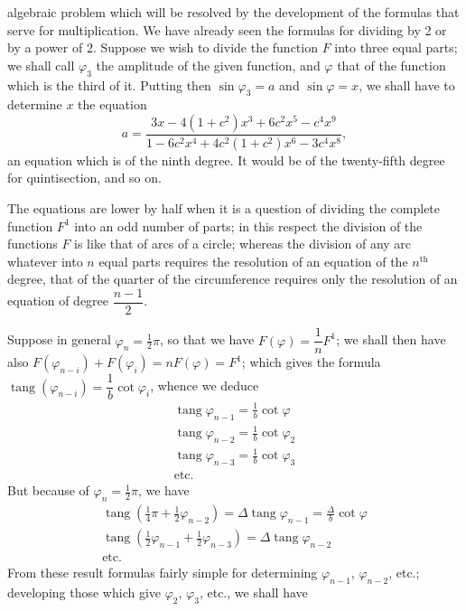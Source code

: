 \documentclass{article}
\begin{document}
algebraic problem which will be resolved by the development of the formulas that serve for multiplication. We have already seen the formulas for dividing by 2 or by a power of 2. Suppose we wish to divide the function $F$ into three equal parts; we shall call $\varphi_{3}$ the amplitude of the given function, and $\varphi$ that of the function which is the third of it. Putting then $\sin\varphi_{3}=a$ and $\sin\varphi=x$, we shall have to determine $x$ the equation
\[ a=\frac{3x-4(1+c^{2})x^{3}+6c^{2}x^{5}-c^{4}x^{9}}{1-6c^{2}x^{4}+4c^{2}(1+c^{2})x^{6}-3c^{4}x^{8}}, \]
an equation which is of the ninth degree. It would be of the twenty-fifth degree for quintisection, and so on.

The equations are lower by half when it is a question of dividing the complete function $F^{1}$ into an odd number of parts; in this respect the division of the functions $F$ is like that of arcs of a circle; whereas the division of any arc whatever into $n$ equal parts requires the resolution of an equation of the $n^{\text{th}}$ degree, that of the quarter of the circumference requires only the resolution of an equation of degree $\dfrac{n-1}{2}$.

Suppose in general $\varphi_{n}=\frac{1}{2}\pi$, so that we have $F(\varphi)=\dfrac{1}{n}F^{1}$; we shall then have also $F(\varphi_{n-i})+F(\varphi_{i})=nF(\varphi)=F^{1}$; which gives the formula $\operatorname{tang}(\varphi_{n-i})=\dfrac{1}{b}\cot\varphi_{i}$, whence we deduce
\[ \begin{gathered} \operatorname{tang}\varphi_{n-1}=\frac{1}{b}\cot\varphi \\ \operatorname{tang}\varphi_{n-2}=\frac{1}{b}\cot\varphi_{2} \\ \operatorname{tang}\varphi_{n-3}=\frac{1}{b}\cot\varphi_{3} \\ \text{etc.} \end{gathered} \]
But because of $\varphi_{n}=\frac{1}{2}\pi$, we have
\[ \begin{gathered} \operatorname{tang}(\tfrac{1}{4}\pi+\tfrac{1}{2}\varphi_{n-2})=\Delta\operatorname{tang}\varphi_{n-1}=\frac{\Delta}{b}\cot\varphi \\ \operatorname{tang}(\tfrac{1}{2}\varphi_{n-1}+\tfrac{1}{2}\varphi_{n-3})=\Delta\operatorname{tang}\varphi_{n-2} \\ \text{etc.} \end{gathered} \]
From these result formulas fairly simple for determining $\varphi_{n-1}$, $\varphi_{n-2}$, etc.; developing those which give $\varphi_{2}$, $\varphi_{3}$, etc., we shall have
\end{document}
